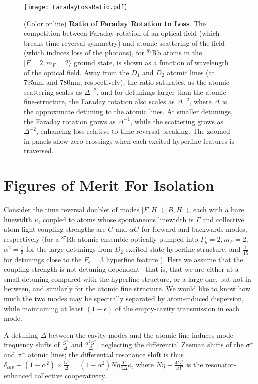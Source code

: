 \documentclass[aps,pra,twocolumn,groupedaddress,10pt,showpacs]{revtex4-1}
\newcommand{\ket}[1]{| #1\rangle}
\begin{document}
\begin{figure}
\texttt{[image: FaradayLossRatio.pdf]}
\caption{(Color online) \textbf{Ratio of Faraday Rotation to Loss}. The competition between Faraday rotation of an optical field (which breaks time reversal symmetry) and atomic scattering of the field (which induces loss of the photons), for $^{87}$Rb atoms in the $\ket{F=2,m_F=2}$ ground state, is shown as a function of wavelength of the optical field. Away from the $D_1$ and $D_2$ atomic lines (at 795nm and 780nm, respectively), the ratio saturates, as the atomic scattering scales as $\Delta^{-2}$, and for detunings larger than the atomic fine-structure, the Faraday rotation also scales as $\Delta^{-2}$, where $\Delta$ is the approximate detuning to the atomic lines. At smaller detunings, the Faraday rotation grows as $\Delta^{-1}$, while the scattering grows as $\Delta^{-2}$, enhancing loss relative to time-reversal breaking. The zoomed-in panels show zero crossings when each excited hyperfine features is traversed.
}
\label{SI_FIG:RbFaraday}
\end{figure}

\section{Figures of Merit For Isolation}
\label{App:IsoTheory}
Consider the time reversal doublet of modes $|F,H^+\rangle$,$|B,H^-\rangle$, each with a bare linewidth $\kappa$, coupled to atoms whose spontaneous linewidth is $\Gamma$ and collective atom-light coupling strengths are $G$ and $\alpha G$ for forward and backwards modes, respectively (for a $^{87}$Rb atomic ensemble optically pumped into $F_g=2,m_F=2$, $\alpha^2=\frac{1}{3}$ for the large detunings from $D_2$ excited state hyperfine structure, and $\frac{1}{15}$ for detunings close to the $F_e=3$ hyperfine feature \cite{steck2001rubidium}). Here we assume that the coupling strength is not detuning dependent-- that is, that we are either at a small detuning compared with the hyperfine structure, or a large one, but not in-between, and similarly for the atomic fine structure. We would like to know how much the two modes may be spectrally separated by atom-induced dispersion, while maintaining at least $(1-\epsilon)$ of the empty-cavity transmission in each mode.

A detuning $\Delta$ between the cavity modes and the atomic line induces mode frequency shifts of $\frac{G^2}{\Delta}$ and $\frac{\alpha^2 G^2}{\Delta}$, neglecting the differential Zeeman shifts of the $\sigma^+$ and $\sigma^-$ atomic lines; the differential resonance shift is thus $\delta_{cav}\equiv(1-\alpha^2)\times\frac{G^2}{\Delta}=(1-\alpha^2) N\eta\frac{\Gamma}{4\Delta}\kappa$, where $N\eta\equiv \frac{4 G^2}{\kappa\Gamma}$ is the resonator-enhanced collective cooperativity.
\end{document}
